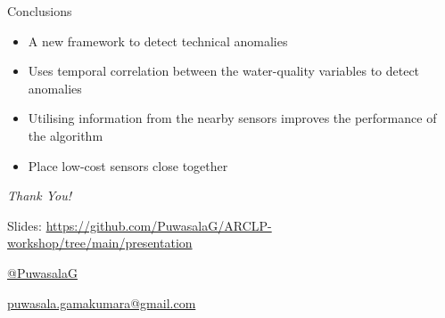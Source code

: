 \documentclass[14pt,ignorenonframetext,compress]{beamer}
\begin{document}
\begin{frame}{Conclusions}
\protect\hypertarget{conclusions}{}
\begin{itemize}
\item
  A new framework to detect technical anomalies
\item
  Uses temporal correlation between the water-quality variables to
  detect anomalies
\item
  Utilising information from the nearby sensors improves the performance
  of the algorithm
\item
  Place low-cost sensors close together
\end{itemize}
\end{frame}

\begin{frame}
\begin{center}
\Huge \emph{Thank You!}
\end{center}

\begin{block}{}
Slides: \textcolor{blue}{\url{https://github.com/PuwasalaG/ARCLP-workshop/tree/main/presentation}}
\vspace*{1cm}

\href{https://github.com/PuwasalaG}{  @PuwasalaG}

\href{mailto:puwasala.gamakumara@gmail.com}{  puwasala.gamakumara@gmail.com}
\end{block}
\end{frame}
\end{document}
